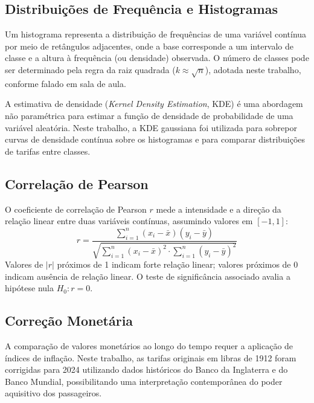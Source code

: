\documentclass[conference]{IEEEtran}
\begin{document}
\subsection{Distribuições de Frequência e Histogramas}

Um histograma representa a distribuição de frequências de uma variável
contínua por meio de retângulos adjacentes, onde a base corresponde a um
intervalo de classe e a altura à frequência (ou densidade) observada. O
número de classes pode ser determinado pela regra da raiz quadrada
($k \approx \sqrt{n}$), adotada neste trabalho, conforme falado em sala de aula.

A estimativa de densidade (\textit{Kernel Density Estimation},
KDE) é uma abordagem não paramétrica para estimar a função de densidade de
probabilidade de uma variável aleatória. Neste trabalho,
a KDE gaussiana foi utilizada para sobrepor curvas de densidade contínua
sobre os histogramas e para comparar distribuições de tarifas entre classes.

\subsection{Correlação de Pearson}

O coeficiente de correlação de Pearson $r$ mede a intensidade e a direção
da relação linear entre duas variáveis contínuas, assumindo valores em
$[-1, 1]$:
\begin{equation}
  r = \frac{\sum_{i=1}^{n}(x_i - \bar{x})(y_i - \bar{y})}
           {\sqrt{\sum_{i=1}^{n}(x_i - \bar{x})^2 \cdot
                  \sum_{i=1}^{n}(y_i - \bar{y})^2}}
\end{equation}
Valores de $|r|$ próximos de 1 indicam forte relação linear; valores próximos
de 0 indicam ausência de relação linear. O teste de significância associado
avalia a hipótese nula $H_0: r = 0$.

\subsection{Correção Monetária}

A comparação de valores monetários ao longo do tempo requer a aplicação de
índices de inflação. Neste trabalho, as tarifas originais em libras de 1912
foram corrigidas para 2024 utilizando dados históricos do Banco da Inglaterra
e do Banco Mundial, possibilitando uma interpretação contemporânea do poder
aquisitivo dos passageiros.

\end{document}
